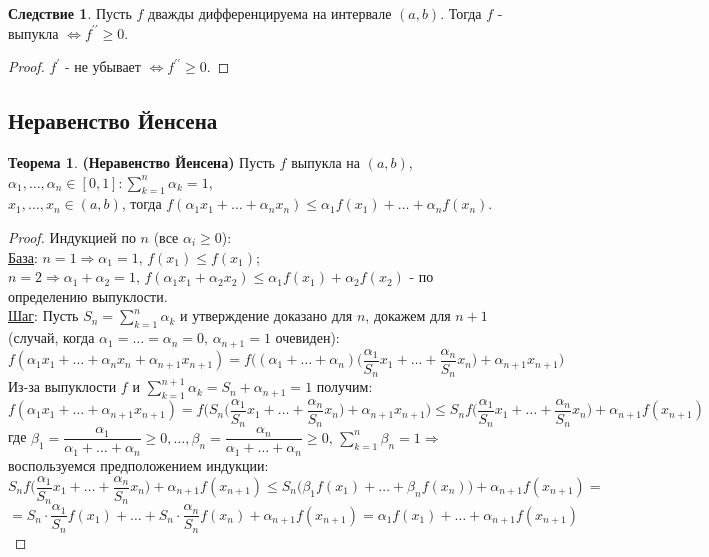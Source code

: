 \documentclass[12pt]{article}
\theoremstyle{definition}
\newtheorem{theorem}{Теорема}
\newtheorem{corollary}{Следствие}
\begin{document}
\begin{corollary}
	Пусть $f$ дважды дифференцируема на интервале $(a,b)$. Тогда $f$ - выпукла $\Leftrightarrow f^{\prime\prime} \geq 0$.
\end{corollary}

\begin{proof}
	$f^\prime$ - не убывает $\Leftrightarrow f^{\prime\prime} \geq 0$.
\end{proof}
\newpage
\subsection*{Неравенство Йенсена}
\begin{theorem}\textbf{(Неравенство Йенсена)}
	Пусть $f$ выпукла на $(a,b)$, $\alpha_1, \dotsc, \alpha_n \in [0,1]\colon \displaystyle \sum\limits_{k=1}^{n}\alpha_k = 1$,\\
	$x_1, \dotsc , x_n \in (a,b)$, тогда $f(\alpha_1 x_1 + \dotsc + \alpha_n x_n) \leq \alpha_1 f(x_1) + \dotsc + \alpha_n f(x_n)$.
\end{theorem}
\begin{proof}
	Индукцией по $n$ (все $\alpha_i \geq 0$):\\
	\uline{База}: $n = 1 \Rightarrow \alpha_1 = 1, \, f(x_1) \leq f(x_1)$; $n = 2 \Rightarrow \alpha_1 + \alpha_2 = 1, \, f(\alpha_1 x_1 + \alpha_2 x_2) \leq \alpha_1 f(x_1) + \alpha_2 f(x_2)$ - по определению выпуклости.\\
	\uline{Шаг}: Пусть $S_n = \displaystyle \sum\limits_{k=1}^{n}\alpha_k$ и утверждение доказано для $n$, докажем для $n+1$ (случай, когда $\alpha_1 = \dotsc = \alpha_n = 0, \, \alpha_{n+1} = 1$ очевиден):
	$$f(\alpha_1 x_1 + \dotsc + \alpha_n x_n + \alpha_{n+1} x_{n+1}) = f\Big((\alpha_1 + \dotsc + \alpha_n)\Big(\dfrac{\alpha_1}{S_n}x_1 + \dotsc + \dfrac{\alpha_n}{S_n}x_n\Big) + \alpha_{n+1} x_{n+1}\Big)$$
	Из-за выпуклости $f$ и $\displaystyle \sum\limits_{k=1}^{n+1}\alpha_k = S_n + \alpha_{n+1} = 1$ получим:
	$$f(\alpha_1 x_1 + \dotsc + \alpha_{n+1} x_{n+1}) = f\Big(S_n\Big(\dfrac{\alpha_1}{S_n}x_1 + \dotsc + \dfrac{\alpha_n}{S_n}x_n\Big) + \alpha_{n+1} x_{n+1}\Big) \leq S_nf\Big(\dfrac{\alpha_1}{S_n}x_1 + \dotsc + \dfrac{\alpha_n}{S_n}x_n\Big) + \alpha_{n+1} f(x_{n+1})$$
	где $\beta_1 = \dfrac{\alpha_1}{\alpha_1 + \dotsc + \alpha_n} \geq 0, \dotsc , \beta_ n = \dfrac{\alpha_n}{\alpha_1 + \dotsc + \alpha_n} \geq 0, \, \displaystyle \sum\limits_{k=1}^{n}\beta_n = 1 \Rightarrow$ воспользуемся предположением индукции:
	$$S_nf\Big(\dfrac{\alpha_1}{S_n}x_1 + \dotsc + \dfrac{\alpha_n}{S_n}x_n\Big) + \alpha_{n+1} f(x_{n+1}) \leq  S_n \Big(\beta_1 f(x_1) + \dotsc + \beta_n f(x_n) \Big) + \alpha_{n+1}f(x_{n+1}) = $$
	$$ = S_n{\cdot}\dfrac{\alpha_1}{S_n}f(x_1) + \dotsc + S_n{\cdot}\dfrac{\alpha_n}{S_n}f(x_n) + \alpha_{n+1} f(x_{n+1}) = \alpha_1 f(x_1) + \dotsc + \alpha_{n+1}f(x_{n+1})$$
\end{proof}
\end{document}
